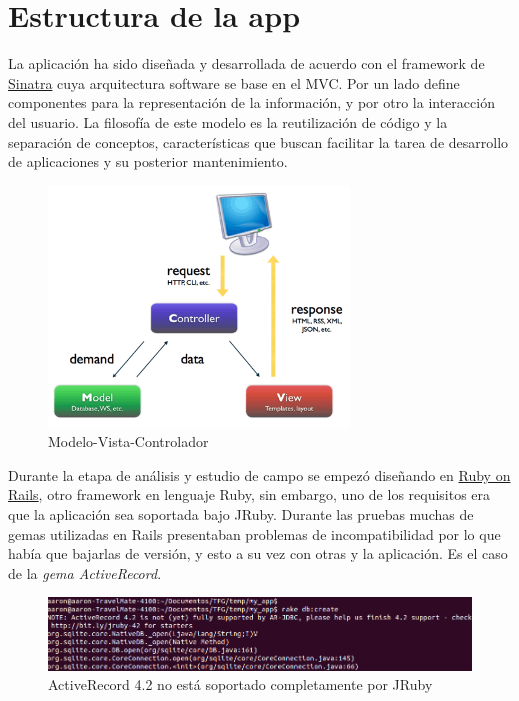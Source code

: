 \section{Estructura de la app}\label{cap.4.2}
La aplicación ha sido diseñada y desarrollada de acuerdo con el framework de \href{http://www.sinatrarb.com/}{Sinatra} cuya arquitectura software se base en el MVC. Por un lado define componentes para la representación de la información, y por otro la interacción del usuario. La filosofía de este modelo es la reutilización de código y la separación de conceptos, características que buscan facilitar la tarea de desarrollo de aplicaciones y su posterior mantenimiento. \\

\begin{figure}[H]
	\centering
	\includegraphics[width=8cm]{./images/mvc.png}
	\caption{Modelo-Vista-Controlador} \label{fig:MVC}
\end{figure}

Durante la etapa de análisis y estudio de campo se empezó diseñando en \href{http://rubyonrails.org/}{Ruby on Rails}, otro framework en lenguaje Ruby, sin embargo, uno de los requisitos era que la aplicación sea soportada bajo JRuby. Durante las pruebas muchas de gemas utilizadas en Rails presentaban problemas de incompatibilidad por lo que había que bajarlas de versión, y esto a su vez con otras y la aplicación. Es el caso de la \emph{gema ActiveRecord}. 

\begin{figure}[H]
	\centering
	\includegraphics[width=12cm]{./images/activerecord-message.png}
	\caption{ActiveRecord 4.2 no está soportado completamente por JRuby} \label{fig:AvtiveRecord-no-supported}
\end{figure}

